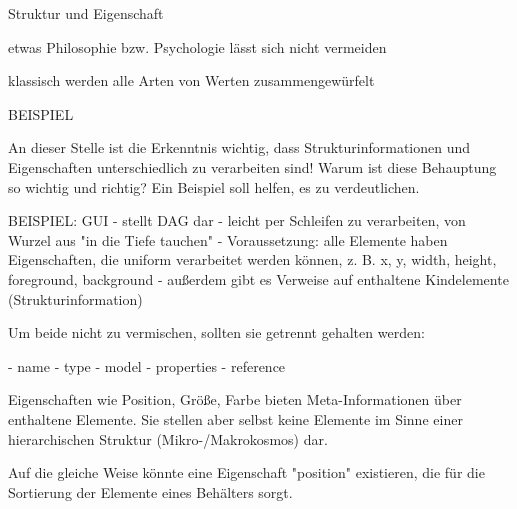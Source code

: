 
Struktur und Eigenschaft

etwas Philosophie bzw. Psychologie lässt sich nicht vermeiden

klassisch werden alle Arten von Werten zusammengewürfelt

BEISPIEL

An dieser Stelle ist die Erkenntnis wichtig, dass Strukturinformationen
und Eigenschaften unterschiedlich zu verarbeiten sind!
Warum ist diese Behauptung so wichtig und richtig?
Ein Beispiel soll helfen, es zu verdeutlichen.

BEISPIEL: GUI
- stellt DAG dar
- leicht per Schleifen zu verarbeiten, von Wurzel aus "in die Tiefe tauchen"
- Voraussetzung: alle Elemente haben Eigenschaften, die uniform
  verarbeitet werden können, z. B. x, y, width, height, foreground, background
- außerdem gibt es Verweise auf enthaltene Kindelemente (Strukturinformation)

Um beide nicht zu vermischen, sollten sie getrennt gehalten werden:

- name
- type
- model
- properties
- reference

Eigenschaften wie Position, Größe, Farbe bieten Meta-Informationen
über enthaltene Elemente. Sie stellen aber selbst keine Elemente
im Sinne einer hierarchischen Struktur (Mikro-/Makrokosmos) dar.

Auf die gleiche Weise könnte eine Eigenschaft "position" existieren,
die für die Sortierung der Elemente eines Behälters sorgt.
